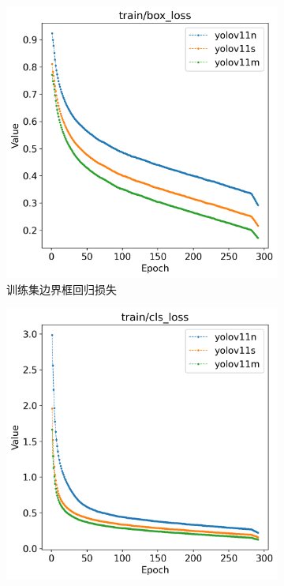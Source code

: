 \begin{figure}[H]
    \centering
    \begin{subfigure}[t]{0.43\textwidth}
        \centering
        \includegraphics[width=\textwidth]{figs/chap04/track_result/track_train_box_loss.png}
        \caption{训练集边界框回归损失}
        \label{fig:track_train_box_loss}
    \end{subfigure}
    \begin{subfigure}[t]{0.43\textwidth}
        \centering
        \includegraphics[width=\textwidth]{figs/chap04/track_result/track_train_cls_loss.png}

\end{subfigure}
\end{figure}
